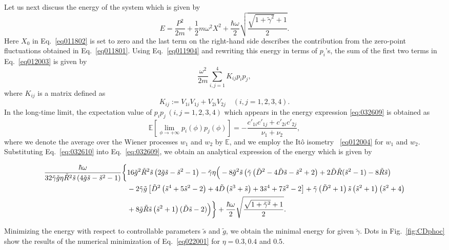 \documentclass[aps,pra,superscriptaddress,twocolumn
]{revtex4-2}
\begin{document}
 
 
 Let us next discuss the energy of the system which is given by
 \begin{equation}
  E = \frac{P^2}{2m}+\frac{1}{2}m\omega^2 X^2 + 
  \frac{\hbar\omega}{2} \sqrt{\frac{\sqrt{1+\tilde \gamma^2}+1}{2}}. \label{eq012003}
 \end{equation}
 Here $X_0$ in Eq.~\eqref{eq011802} is set to zero and 
 the last term on the right-hand side describes the contribution 
 from the zero-point fluctuations obtained in Eq.~\eqref{eq011801}. 
 Using Eq.~\eqref{eq011904} and rewriting this energy in terms of $p_i$'s, 
 the sum of the first two terms in Eq.~\eqref{eq012003} is given by 
 \begin{equation}
  \frac{\omega^2}{2m}\sum_{i,j=1}^4 K_{ij} p_i p_j, \label{eq:032609}
 \end{equation}
 where $K_{ij}$ is a matrix defined as 
 \begin{equation}
  K_{ij} := V_{1i} V_{1j} + V_{2i} V_{2j} \quad 
  (i,j = 1,2,3,4).
 \end{equation}
 In the long-time limit, 
 the expectation value of $p_i p_j \,(i,j=1,2,3,4)$ 
 which appears in the energy expression \eqref{eq:032609} is obtained as
 \begin{equation}
  \mathbb{E}\left[ \lim_{\phi \to +\infty} p_i (\phi)p_j(\phi)\right]
  = -\frac{c'_{1i}c'_{1j} + c'_{2i} c'_{2j}}{\nu_1 + \nu_2}, \label{eq:032610}
 \end{equation}
 where we denote the average over the Wiener processes $w_1$ and $w_2$ by $\mathbb{E}$, 
 and we employ the It\^o isometry~\cite{oksendal2013stochastic} \eqref{eq012004} for $w_1$ and $w_2$.
 Substituting Eq.~\eqref{eq:032610} into Eq.~\eqref{eq:032609}, 
 we obtain an analytical expression of the energy 
 which is given by 
 \begin{widetext}
 \begin{alignat}{1}
  \notag \frac{\hbar \omega }{32 \tilde{\gamma} \tilde g \eta \tilde R^2 \tilde{s} \left(4\tilde g \tilde{s}-\tilde{s}^2-1\right)} 
  \notag \bigg\{ 
      &16\tilde g^2 \tilde R^2 \tilde{s} \left(2\tilde g \tilde{s}-\tilde{s}^2-1\right)-\tilde{\gamma}  \eta  
  \Big( -8\tilde g^2 \tilde{s} \left(\tilde{\gamma}  \left(\tilde D^2-4 \tilde D \tilde{s}-\tilde{s}^2+2\right)+2 \tilde D \tilde R (\tilde{s}^2-1)-8 \tilde R \tilde{s}\right) \\
  \notag & -2 \tilde{\gamma} \tilde g \left[\tilde D^2 \left(\tilde{s}^4+5 \tilde{s}^2-2\right)+4 \tilde D \left(\tilde{s}^3+\tilde{s}\right)+3 \tilde{s}^4+7 \tilde{s}^2-2\right]+\tilde{\gamma}  \left(\tilde D^2+1\right) \tilde{s} \left(\tilde{s}^2+1\right) \left(\tilde{s}^2+4\right) \\
    &+8\tilde g \tilde R \tilde{s} \left(\tilde{s}^2+1\right) (\tilde D \tilde{s}-2) 
  \Big) 
  \bigg\}+\frac{\hbar\omega}{2} \sqrt{\frac{\sqrt{1+\tilde \gamma^2}+1}{2}}. \label{eq022001}
 \end{alignat}
 \end{widetext}
 Minimizing the energy with respect to controllable parameters $\tilde s$ and $\tilde g$, 
 we obtain the minimal energy for given $\tilde \gamma$. 
 Dots in Fig.~\ref{fig:CDphoc} show the results of the numerical minimization of Eq.~\eqref{eq022001} 
 for $\eta=0.3,0.4$ and $0.5$.
 
\end{document}
